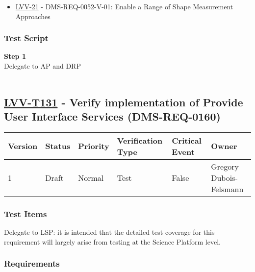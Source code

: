 \begin{itemize}
\tightlist
\item
  \href{https://jira.lsstcorp.org/browse/LVV-21}{LVV-21} -
  DMS-REQ-0052-V-01: Enable a Range of Shape Measurement Approaches
\end{itemize}

\hypertarget{test-script-107}{%
\subsubsection{Test Script}\label{test-script-107}}

\textbf{Step 1}\\
Delegate to AP and DRP\\
~\\

\hypertarget{lvv-t131---verify-implementation-of-provide-user-interface-services-dms-req-0160}{%
\subsection{\texorpdfstring{\href{https://jira.lsstcorp.org/secure/Tests.jspa\#/testCase/LVV-T131}{LVV-T131}
- Verify implementation of Provide User Interface Services
(DMS-REQ-0160)}{LVV-T131 - Verify implementation of Provide User Interface Services (DMS-REQ-0160)}}\label{lvv-t131---verify-implementation-of-provide-user-interface-services-dms-req-0160}}

\begin{longtable}[]{@{}llllll@{}}
\toprule
Version & Status & Priority & Verification Type & Critical Event &
Owner\tabularnewline
\midrule
\endhead
1 & Draft & Normal & Test & False & Gregory
Dubois-Felsmann\tabularnewline
\bottomrule
\end{longtable}

\hypertarget{test-items-107}{%
\subsubsection{Test Items}\label{test-items-107}}

Delegate to LSP: it is intended that the detailed test coverage for this
requirement will largely arise from testing at the Science Platform
level.

\hypertarget{requirements-108}{%
\subsubsection{Requirements}\label{requirements-108}}

